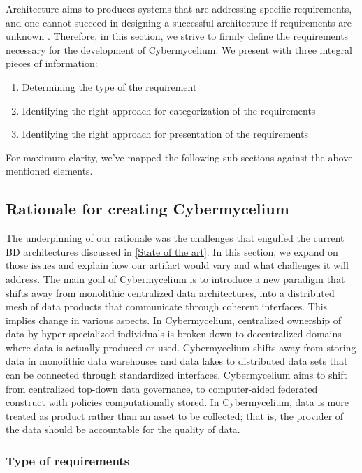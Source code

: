 \documentclass{bmcart}
\begin{document}
Architecture aims to produces systems that are addressing specific requirements, and one cannot succeed in designing a successful architecture if requirements are unknown \cite{SoftwareArchitectureKazman}. Therefore, in this section, we strive to firmly define the requirements necessary for the development of Cybermycelium. We present with three integral pieces of information: 

\begin{enumerate}
    \item Determining the type of the requirement 
    \item Identifying the right approach for categorization of the requirements 
    \item Identifying the right approach for presentation of the requirements 
\end{enumerate}

For maximum clarity, we've mapped the following sub-sections against the above mentioned elements. 

\subsection{Rationale for creating Cybermycelium}

The underpinning of our rationale was the challenges that engulfed the current BD architectures discussed in \ref{State of the art}. In this section, we expand on those issues and explain how our artifact would vary and what challenges it will address. The main goal of Cybermycelium is to introduce a new paradigm that shifts away from monolithic centralized data architectures, into a distributed mesh of data products that communicate through coherent interfaces. This implies change in various aspects. In Cybermycelium, centralized ownership of data by hyper-specialized individuals is broken down to decentralized domains where data is actually produced or used. Cybermycelium shifts away from storing data in monolithic data warehouses and data lakes to distributed data sets that can be connected through standardized interfaces. Cybermycelium aims to shift from centralized top-down data governance, to computer-aided federated construct with policies computationally stored. In Cybermycelium, data is more treated as product rather than an asset to be collected; that is, the provider of the data should be accountable for the quality of data.

\subsubsection{Type of requirements}
\end{document}
